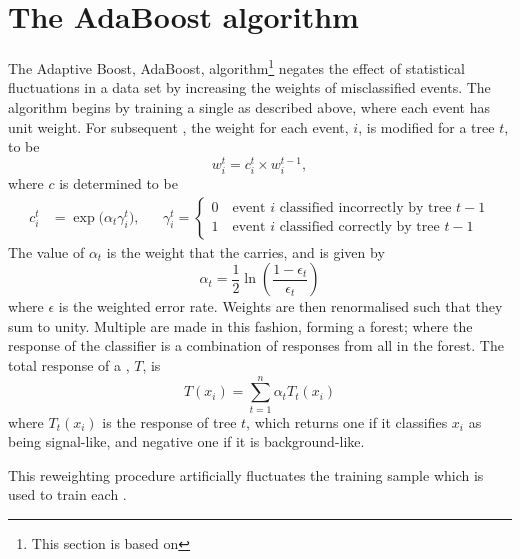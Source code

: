 \section{The AdaBoost algorithm}
\label{sec:bdt:ada}
The Adaptive Boost, AdaBoost, algorithm\footnote{
  This section is based on } negates the effect of statistical
fluctuations in a data set by increasing the weights of misclassified events.
The algorithm begins by training a single \DT as described above, where each event has unit weight.
For subsequent \DTs, the weight for each event, $i$, is modified for a tree $t$, to be
\begin{equation}
  w_i^t = c_i^t \times w_i^{t-1},
  \label{eq:ada:wt}
\end{equation}
where $c$ is determined to be
\begin{align}
  c_i^t &= \exp\big(\alpha_t\gamma_i^t\big),
  &&
  \gamma_i^t=\left\{
    \begin{array}{l}
      0\quad\text{event $i$ classified incorrectly by tree $t-1$} \\
      1\quad\text{event $i$ classified correctly by tree $t-1$}
    \end{array}
  \right.
\end{align}
The value of $\alpha_t$ is the weight that the \DT carries, and is given by
\begin{equation}
  \alpha_t = \frac12\ln\left(\frac{1-\epsilon_t}{\epsilon_t}\right)
\end{equation}
where $\epsilon$ is the weighted error rate.
Weights are then renormalised such that they sum to unity.
Multiple \DTs are made in this fashion, forming a forest; where the response of the \BDT classifier
is a combination of responses from all \DTs in the forest.
The total response of a \BDT, $T$, is
\begin{equation}
  T(x_i) = \sum_{t=1}^{n} \alpha_tT_t(x_i)
  \label{eq:ada:fullbdt}
\end{equation}
where $T_t(x_i)$ is the response of tree $t$, which returns one if it classifies $x_i$ as being
signal-like, and negative one if it is background-like.

This reweighting procedure artificially fluctuates the training sample which is used to train
each \DT.


